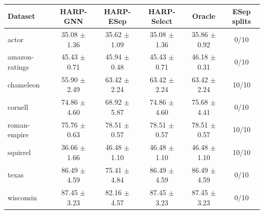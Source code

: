 \begin{tabular*}{0.94\linewidth}{@{\extracolsep{\fill}}lccccc@{}}
\toprule
Dataset & HARP-GNN & HARP-ESep & HARP-Select & Oracle & ESep splits \\
\midrule
actor & 35.08 $\pm$ 1.36 & 35.62 $\pm$ 1.09 & 35.08 $\pm$ 1.36 & 35.86 $\pm$ 0.92 & 0/10 \\
amazon-ratings & 45.43 $\pm$ 0.71 & 45.94 $\pm$ 0.48 & 45.43 $\pm$ 0.71 & 46.18 $\pm$ 0.31 & 0/10 \\
chameleon & 55.90 $\pm$ 2.49 & 63.42 $\pm$ 2.24 & 63.42 $\pm$ 2.24 & 63.42 $\pm$ 2.24 & 10/10 \\
cornell & 74.86 $\pm$ 4.60 & 68.92 $\pm$ 5.87 & 74.86 $\pm$ 4.60 & 75.68 $\pm$ 4.41 & 0/10 \\
roman-empire & 75.76 $\pm$ 0.63 & 78.51 $\pm$ 0.57 & 78.51 $\pm$ 0.57 & 78.51 $\pm$ 0.57 & 10/10 \\
squirrel & 36.66 $\pm$ 1.66 & 46.48 $\pm$ 1.10 & 46.48 $\pm$ 1.10 & 46.48 $\pm$ 1.10 & 10/10 \\
texas & 86.49 $\pm$ 4.59 & 75.41 $\pm$ 4.84 & 86.49 $\pm$ 4.59 & 86.49 $\pm$ 4.59 & 0/10 \\
wisconsin & 87.45 $\pm$ 3.23 & 82.16 $\pm$ 4.57 & 87.45 $\pm$ 3.23 & 87.45 $\pm$ 3.23 & 0/10 \\
\bottomrule
\end{tabular*}
